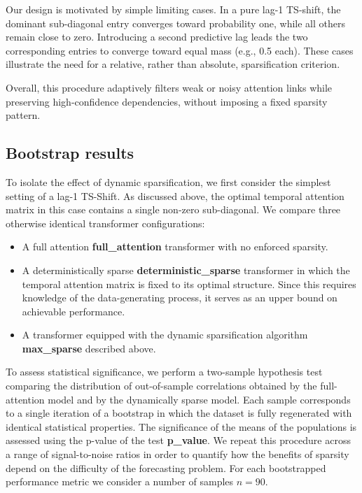 \documentclass{article}
\begin{document}
Our design is motivated by simple limiting cases. In a pure lag-1 TS-shift, the dominant sub-diagonal entry converges toward probability one, while all others remain close to zero. Introducing a second predictive lag leads the two corresponding entries to converge toward equal mass (e.g., 0.5 each). These cases illustrate the need for a relative, rather than absolute, sparsification criterion.

Overall, this procedure adaptively filters weak or noisy attention links while preserving high-confidence dependencies, without imposing a fixed sparsity pattern.

\subsection{Bootstrap results}\label{sparsity_results}

To isolate the effect of dynamic sparsification, we first consider the simplest setting of a lag-1 TS-Shift. As discussed above, the optimal temporal attention matrix in this case contains a single non-zero sub-diagonal. We compare three otherwise identical transformer configurations:
\begin{itemize}
    \item A full attention \textbf{full\_attention} transformer with no enforced sparsity.
    \item A deterministically sparse \textbf{deterministic\_sparse} transformer in which the temporal attention matrix is fixed to its optimal structure. Since this requires knowledge of the data-generating process, it serves as an upper bound on achievable performance.
    \item A transformer equipped with the dynamic sparsification algorithm \textbf{max\_sparse} described above.
\end{itemize}

To assess statistical significance, we perform a two-sample hypothesis test comparing the distribution of out-of-sample correlations obtained by the full-attention model and by the dynamically sparse model. Each sample corresponds to a single iteration of a bootstrap in which the dataset is fully regenerated with identical statistical properties. The significance of the means of the populations is assessed using the p-value of the test \textbf{p\_value}. We repeat this procedure across a range of signal-to-noise ratios in order to quantify how the benefits of sparsity depend on the difficulty of the forecasting problem. For each bootstrapped performance metric we consider a number of samples $n = 90$.
\end{document}
